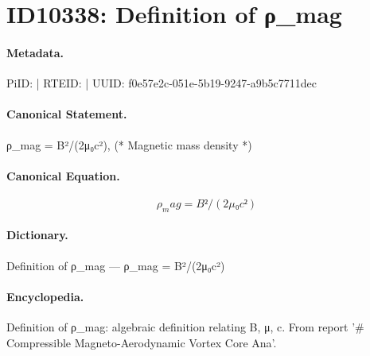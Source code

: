 \section*{ID10338: Definition of ρ\_mag}
\paragraph{Metadata.}
PiID:  | RTEID:  | UUID: f0e57e2c-051e-5b19-9247-a9b5c7711dec

\paragraph{Canonical Statement.}
ρ\_mag = B²/(2μ₀c²), (* Magnetic mass density *)

\paragraph{Canonical Equation.}
\[
ρ_mag = B²/(2μ₀c²)
\]

\paragraph{Dictionary.}
Definition of ρ\_mag — ρ\_mag = B²/(2μ₀c²)

\paragraph{Encyclopedia.}
Definition of ρ\_mag: algebraic definition relating B, μ, c. From report '\# Compressible Magneto-Aerodynamic Vortex Core Ana'.
